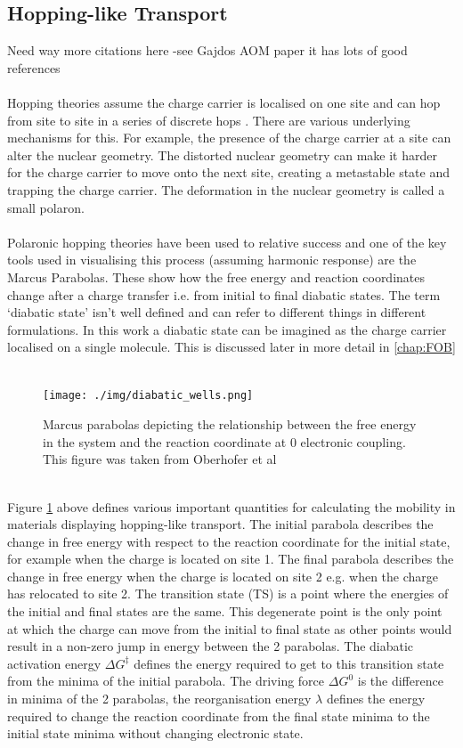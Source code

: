 \subsection{Hopping-like Transport}
{\Large Need way more citations here -see Gajdos AOM paper it has lots of good references}
\\\\
Hopping theories assume the charge carrier is localised on one site and can hop from site to site in a series of discrete hops \cite{oberhofer_charge_2017}. There are various underlying mechanisms for this. For example, the presence of the charge carrier at a site can alter the nuclear geometry. The distorted nuclear geometry can make it harder for the charge carrier to move onto the next site, creating a metastable state and trapping the charge carrier. The deformation in the nuclear geometry is called a small polaron.
\\\\
Polaronic hopping theories have been used to relative success and one of the key tools used in visualising this process (assuming harmonic response) are the Marcus Parabolas. These show how the free energy and reaction coordinates change after a charge transfer i.e. from initial to final diabatic states. The term `diabatic state' isn't well defined and can refer to different things in different formulations. In this work a diabatic state can be imagined as the charge carrier localised on a single molecule. This is discussed later in more detail in  \ref{chap:FOB}\\
\\
\begin{figure}[ht]
  \texttt{[image: ./img/diabatic\_wells.png]}
  \caption{Marcus parabolas depicting the relationship between the free energy in the system and the reaction coordinate at 0 electronic coupling. This figure was taken from Oberhofer et al \cite{oberhofer_charge_2017}}
  \label{fig:diab_wells}
\end{figure}
\\
Figure \ref{fig:diab_wells} above defines various important quantities for calculating the mobility in materials displaying hopping-like transport. The initial parabola describes the change in free energy with respect to the reaction coordinate for the initial state, for example when the charge is located on site 1. The final parabola describes the change in free energy when the charge is located on site 2 e.g. when the charge has relocated to site 2. The transition state (TS) is a point where the energies of the initial and final states are the same. This degenerate point is the only point at which the charge can move from the initial to final state as other points would result in a non-zero jump in energy between the 2 parabolas. The diabatic activation energy $\Delta G^{\ddagger}$ defines the energy required to get to this transition state from the minima of the initial parabola. The driving force $\Delta G^{0}$ is the difference in minima of the 2 parabolas, the reorganisation energy $\lambda$ defines the energy required to change the reaction coordinate from the final state minima to the initial state minima without changing electronic state.
